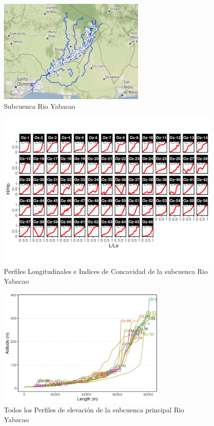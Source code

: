 \documentclass[11pt,]{article}
\begin{document}
\begin{figure}
\centering
\includegraphics[width=0.65000\textwidth]{Productos Generados/p_yabacao.png}
\caption{\label{fig:LFP_yabacao0} Subcuenca Rio Yabacao}
\end{figure}

\begin{figure}
\centering
\includegraphics[width=1.00000\textwidth]{Productos Generados/p_c_yabacao.png}
\caption{\label{fig:LFP_yabacao1} Perfiles Longitudinales e Indices de
Concavidad de la subcuenca Rio Yabacao}
\end{figure}

\begin{figure}
\centering
\includegraphics[width=0.75000\textwidth]{Productos Generados/p_c_yabacao_todos.png}
\caption{\label{fig:LFP_yabacao2} Todos los Perfiles de elevación de la
subcuenca principal Rio Yabacao}
\end{figure}
\end{document}
